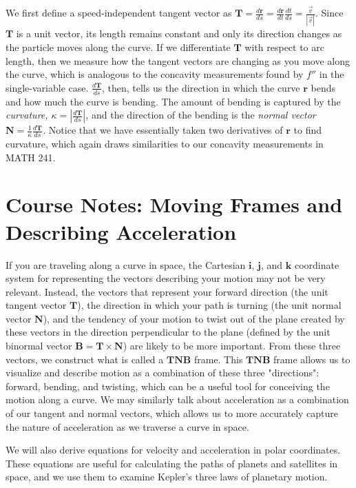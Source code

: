 \documentclass{ximera}
\begin{document}
We first define a speed-independent tangent vector as $\mathbf{T}=\frac{d\mathbf{r}}{ds}=\frac{d\mathbf{r}}{dt}\frac{dt}{ds}=\frac{\vec{v}}{|\vec{v}|}$. Since $\mathbf{T}$ is a unit vector, its length remains constant and only its direction changes as the particle moves along the curve. If we differentiate $\mathbf{T}$ with respect to arc length, then we measure how the tangent vectors are changing as you move along the curve, which is analogous to the concavity measurements found by $f''$ in the single-variable case. $\frac{d\mathbf{T}}{ds}$, then, tells us the direction in which the curve $\mathbf{r}$ bends and how much the curve is bending. The amount of bending is captured by the \emph{curvature, $\kappa=\left|\frac{d\mathbf{T}}{ds}\right|$,} and the direction of the bending is the \emph{normal vector $\mathbf{N}=\frac{1}{\kappa}\frac{d\mathbf{T}}{ds}$.} Notice that we have essentially taken two derivatives of $\mathbf{r}$ to find curvature, which again draws similarities to our concavity measurements in MATH 241.

\section{Course Notes: Moving Frames and Describing Acceleration}

If you are traveling along a curve in space, the Cartesian $\mathbf{i}$, $\mathbf{j}$, and $\mathbf{k}$ coordinate system for representing the vectors describing your motion may not be very relevant. Instead, the vectors that represent your forward direction (the unit tangent vector $\mathbf{T}$), the direction in which your path is turning (the unit normal vector $\mathbf{N}$), and the tendency of your motion to twist out of the plane created by these vectors in the direction perpendicular to the plane (defined by the unit binormal vector $\mathbf{B}=\mathbf{T}\times\mathbf{N}$) are likely to be more important. From these three vectors, we construct what is called a $\mathbf{TNB}$ frame. This $\mathbf{TNB}$ frame allows us to visualize and describe motion as a combination of these three "directions": forward, bending, and twisting, which can be a useful tool for conceiving the motion along a curve. We may similarly talk about acceleration as a combination of our tangent and normal vectors, which allows us to more accurately capture the nature of acceleration as we traverse a curve in space.

We will also derive equations for velocity and acceleration in polar coordinates. These equations are useful for calculating the paths of planets and satellites in space, and we use them to examine Kepler's three laws of planetary motion.
\end{document}
